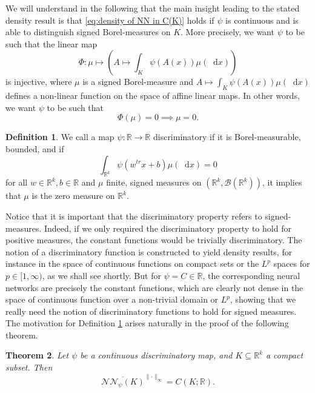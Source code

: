 \documentclass[11pt,a4paper,twoside,openany]{report}
\numberwithin{equation}{section}
\newcommand{\diff}{\mathop{}\!\mathrm{d}}
\theoremstyle{plain} %
\newtheorem{theorem}{Theorem}[section]
\theoremstyle{definition} %
\newtheorem{definition}[theorem]{Definition}
\theoremstyle{remark} %
\begin{document}
We will understand in the following that the main insight leading to the stated density result is that \eqref{eq:density of NN in C(K)} holds if \(\psi\) is continuous and is able to distinguish signed Borel-measures on \(K\). More precisely, we want \(\psi\) to be such that the linear map
\begin{equation*}
    \Phi:\mu\mapsto\left( A\mapsto\int_{K}\psi(A(x))\mu(\diff x)\right)
\end{equation*}
is injective, 
where \(\mu\) is a signed Borel-measure and \(A\mapsto\int_{K}\psi(A(x))\mu(\diff x)\) defines a non-linear function on the space of affine linear maps. In other words, we want \(\psi\) to be such that 
\begin{equation*}
    \Phi(\mu)=0\implies\mu =0. 
\end{equation*} 
\begin{definition}\label{def:discriminatory maps over reals}
    We call a map \(\psi:\mathbb{R}\to\mathbb{R}\) discriminatory if it is Borel-measurable, bounded, and if
    \begin{equation}\label{eq:discriminatory maps over reals}
        \int_{\mathbb{R}^k}\psi(w^{tr}x+b)\mu(\diff x)=0
    \end{equation}
    for all \(w\in\mathbb{R}^k,b\in\mathbb{R}\) and \(\mu\) finite, signed measures on \((\mathbb{R}^k,\mathcal{B}(\mathbb{R}^k))\), it implies that \(\mu\) is the zero measure on \(\mathbb{R}^k\).
\end{definition}
Notice that it is important that the discriminatory property refers to signed-measures. Indeed, if we only required the discriminatory property to hold for positive measures, the constant functions would be trivially discriminatory. The notion of a discriminatory function is constructed to yield density results, for instance in the space of continuous functions on compact sets or the \(L^p\) spaces for \(p\in[1,\infty)\), as we shall see shortly. But for \(\psi=C\in\mathbb{R}\), the corresponding neural networks are precisely the constant functions, which are clearly not dense in the space of continuous function over a non-trivial domain or \(L^p\), showing that we really need the notion of discriminatory functions to hold for signed measures.
The motivation for Definition \ref{def:discriminatory maps over reals} arises naturally in the proof of the following theorem. 
\begin{theorem}\label{thm:density of NN in C(K)}
    Let \(\psi\) be a continuous discriminatory map, and \(K\subseteq\mathbb{R}^k\) a compact subset. Then
    \begin{equation*}
         \overline{\mathcal{NN}_{\psi}(K)}^{\lVert\cdot\rVert_\infty}=C(K;\mathbb{R}).
    \end{equation*}
\end{theorem} 
\end{document}
